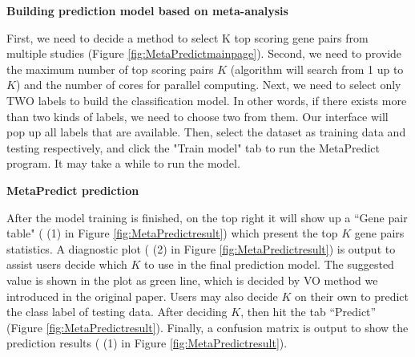 \begin{steps}
\item \textbf{Building prediction model based on meta-analysis}

First, we need to decide a method to select K top scoring gene pairs from multiple studies (Figure \ref{fig:MetaPredictmainpage}). 
Second, we need to provide the maximum number of top scoring pairs $K$ (algorithm will search from 1 up to $K$) and the number of cores for parallel computing. 
Next, we need to select only TWO labels to build the classification model. 
In other words, if there exists more than two kinds of labels, we need to choose two from them. 
Our interface will pop up all labels that are available. 
Then, select the dataset as training data and testing respectively, 
and click the "Train model" tab to run the MetaPredict program. 
It may take a while to run the model.

\item \textbf{MetaPredict prediction}

After the model training is finished, on the top right it will show up a ``Gene pair table" ({\color{red} (1)} in Figure \ref{fig:MetaPredictresult}) which present the top $K$ gene pairs statistics. 
A diagnostic plot ({\color{red} (2)} in Figure \ref{fig:MetaPredictresult}) is output to assist users decide which $K$ to use in the final prediction model. 
The suggested value is shown in the plot as green line, which is decided by VO method we introduced in the original paper. Users may also decide $K$ on their own to predict the class label of testing data. 
After deciding $K$, then hit the tab ``Predict'' (Figure \ref{fig:MetaPredictresult}). 
Finally, a confusion matrix is output to show the prediction results ({\color{red} (1)} in Figure \ref{fig:MetaPredictresult}).


\end{steps}
